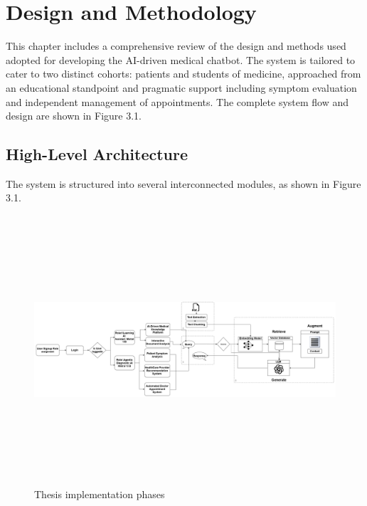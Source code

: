 \chapter{Design and Methodology}
\label{chap:design_methodology}

This chapter includes a comprehensive review of the design and methods used adopted for developing the AI-driven medical chatbot. The system is tailored to cater to two distinct cohorts: patients and students of medicine, approached from an educational standpoint and pragmatic support including symptom evaluation and independent management of appointments. The complete system flow and design are shown in Figure 3.1.

\section{High-Level Architecture}
\label{sec:high_level_architecture}

The system is structured into several interconnected modules, as shown in Figure 3.1.
\begin{figure}[htbp]
    \begin{center}
      \includegraphics[width=16cm,height=10cm]{./Images/Thesis.png}
       \caption{Thesis implementation phases}
       \label{fig: Thesis implementation phases}
    \end{center}
\end{figure}

